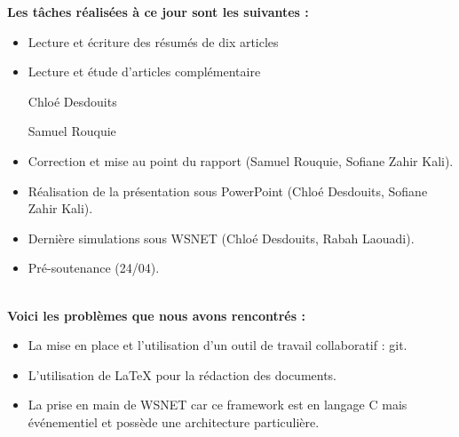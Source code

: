 \documentclass[a4paper]{article}
\begin{document}
{\bfseries Les tâches réalisées à ce jour sont les suivantes :}\\
\begin{itemize}\addtolength{\itemsep}{0.2cm}
\renewcommand\labelitemi{\textbullet}
	\item Lecture et écriture des résumés de dix articles
	\item Lecture et étude d'articles complémentaire
	\begin{description}
	\item[Chloé Desdouits] \cite{Prim1957}
	\item[Samuel Rouquie] \cite{Akyildiz2002} \cite{Dong2005} \cite{Giordano2003} \cite{Kasten2001} \cite{Liang2002} \cite{Wieselthier2000}
	\end{description}
	\item Correction et mise au point du rapport (Samuel Rouquie, Sofiane Zahir Kali).
	\item Réalisation de la présentation sous PowerPoint (Chloé Desdouits, Sofiane Zahir Kali).
	\item Dernière simulations sous WSNET (Chloé Desdouits, Rabah Laouadi).
	\item Pré-soutenance (24/04).

\end{itemize}
~\\
{\bfseries Voici les problèmes que nous avons rencontrés :}\\
\begin{itemize}\addtolength{\itemsep}{0.3cm}
\renewcommand\labelitemi{\textbullet}
	\item La mise en place et l'utilisation d'un outil de travail collaboratif : git.
	\item L'utilisation de \LaTeX{} pour la rédaction des documents.
	\item La prise en main de WSNET car ce framework est en langage C mais événementiel et possède une architecture particulière.

\end{itemize}
\end{document}
